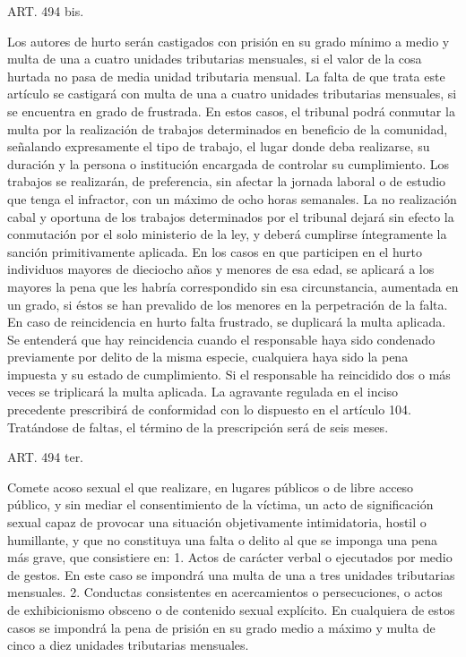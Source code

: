     ART. 494 bis.

    Los autores de hurto serán castigados con prisión en su grado mínimo a medio y multa de una a cuatro unidades tributarias mensuales, si el valor de la cosa hurtada no pasa de media unidad tributaria mensual.
    La falta de que trata este artículo se castigará con multa de una a cuatro unidades tributarias mensuales, si se encuentra en grado de frustrada. En estos casos, el tribunal podrá conmutar la multa por la realización de trabajos determinados en beneficio de la comunidad, señalando expresamente el tipo de trabajo, el lugar donde deba realizarse, su duración y la persona o institución encargada de controlar su cumplimiento. Los trabajos se realizarán, de preferencia, sin afectar la jornada laboral o de estudio que tenga el infractor, con un máximo de ocho horas semanales. La no realización cabal y oportuna de los trabajos determinados por el tribunal dejará sin efecto la conmutación por el solo ministerio de la ley, y deberá cumplirse íntegramente la sanción primitivamente aplicada.
    En los casos en que participen en el hurto individuos mayores de dieciocho años y menores de esa edad, se aplicará a los mayores la pena que les habría correspondido sin esa circunstancia, aumentada en un grado, si éstos se han prevalido de los menores en la perpetración de la falta.
    En caso de reincidencia en hurto falta frustrado, se duplicará la multa aplicada. Se entenderá que hay reincidencia cuando el responsable haya sido condenado previamente por delito de la misma especie, cualquiera haya sido la pena impuesta y su estado de cumplimiento. Si el responsable ha reincidido dos o más veces se triplicará la multa aplicada.
    La agravante regulada en el inciso precedente prescribirá de conformidad con lo dispuesto en el artículo 104. Tratándose de faltas, el término de la prescripción será de seis meses.


    ART. 494 ter.

    Comete acoso sexual el que realizare, en lugares públicos o de libre acceso público, y sin mediar el consentimiento de la víctima, un acto de significación sexual capaz de provocar una situación objetivamente intimidatoria, hostil o humillante, y que no constituya una falta o delito al que se imponga una pena más grave, que consistiere en:
    1. Actos de carácter verbal o ejecutados por medio de gestos. En este caso se impondrá una multa de una a tres unidades tributarias mensuales.
    2. Conductas consistentes en acercamientos o persecuciones, o actos de exhibicionismo obsceno o de contenido sexual explícito. En cualquiera de estos casos se impondrá la pena de prisión en su grado medio a máximo y multa de cinco a diez unidades tributarias mensuales.



